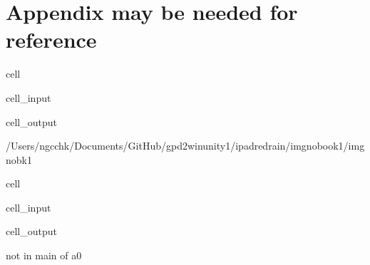 \documentclass[letterpaper,10pt,english]{jupyterBook}
\begin{document}
\chapter{Appendix \sphinxhyphen{} may be needed for reference}
\label{\detokenize{MacTwgssAx-App:appendix-may-be-needed-for-reference}}\label{\detokenize{MacTwgssAx-App::doc}}
\begin{sphinxuseclass}{cell}\begin{sphinxVerbatimInput}

\begin{sphinxuseclass}{cell_input}
\begin{sphinxVerbatim}[commandchars=\\\{\}]
 

\end{sphinxVerbatim}

\end{sphinxuseclass}\end{sphinxVerbatimInput}
\begin{sphinxVerbatimOutput}

\begin{sphinxuseclass}{cell_output}
\begin{sphinxVerbatim}[commandchars=\\\{\}]
/Users/ngcchk/Documents/GitHub/gpd2\PYGZhy{}win\PYGZhy{}unity1/ipadred\PYGZhy{}rain/imgno\PYGZus{}book1/imgnobk1
\end{sphinxVerbatim}

\end{sphinxuseclass}\end{sphinxVerbatimOutput}

\end{sphinxuseclass}
\begin{sphinxuseclass}{cell}\begin{sphinxVerbatimInput}

\begin{sphinxuseclass}{cell_input}
\begin{sphinxVerbatim}[commandchars=\\\{\}]
 
\end{sphinxVerbatim}

\end{sphinxuseclass}\end{sphinxVerbatimInput}
\begin{sphinxVerbatimOutput}

\begin{sphinxuseclass}{cell_output}
\begin{sphinxVerbatim}[commandchars=\\\{\}]
not in main of a0
\end{sphinxVerbatim}

\end{sphinxuseclass}\end{sphinxVerbatimOutput}

\end{sphinxuseclass}
\end{document}
